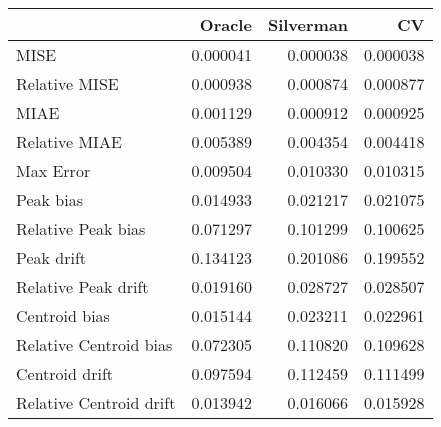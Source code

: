 \begin{tabular}{lrrr}
  \hline
 & Oracle & Silverman & CV \\ 
  \hline
MISE & 0.000041 & 0.000038 & 0.000038 \\ 
  Relative MISE & 0.000938 & 0.000874 & 0.000877 \\ 
  MIAE & 0.001129 & 0.000912 & 0.000925 \\ 
  Relative MIAE & 0.005389 & 0.004354 & 0.004418 \\ 
  Max Error & 0.009504 & 0.010330 & 0.010315 \\ 
  Peak bias & 0.014933 & 0.021217 & 0.021075 \\ 
  Relative Peak bias & 0.071297 & 0.101299 & 0.100625 \\ 
  Peak drift & 0.134123 & 0.201086 & 0.199552 \\ 
  Relative Peak drift & 0.019160 & 0.028727 & 0.028507 \\ 
  Centroid bias & 0.015144 & 0.023211 & 0.022961 \\ 
  Relative Centroid bias & 0.072305 & 0.110820 & 0.109628 \\ 
  Centroid drift & 0.097594 & 0.112459 & 0.111499 \\ 
  Relative Centroid drift & 0.013942 & 0.016066 & 0.015928 \\ 
   \hline
\end{tabular}
